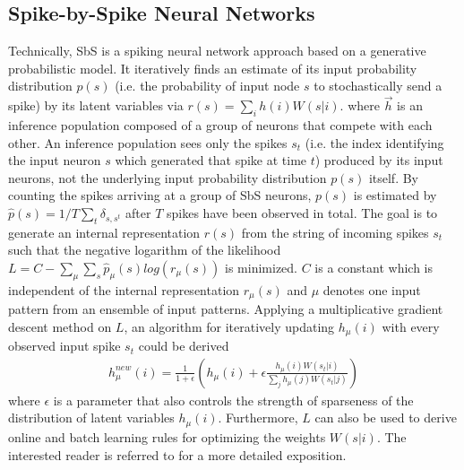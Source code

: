 \subsection{Spike-by-Spike Neural Networks}
\label{sec:sbs}

Technically, SbS is a spiking neural network approach based on a
generative probabilistic model. It iteratively finds an estimate of
its input probability distribution $p(s)$ (i.e. the probability of
input node $s$ to stochastically send a spike) by its latent variables
via $r(s) = \sum_i h(i) W(s|i)$. 
where $\vec{h}$ is an inference
population composed of a group of neurons that compete with each
other. An inference population sees only the spikes $s_t$ (i.e. the
index identifying the input neuron $s$ which generated that spike at
time $t$) produced by its input neurons, not the underlying input
probability distribution $p(s)$ itself. By counting the spikes
arriving at a group of SbS neurons, $p(s)$ is estimated by
$\hat{p}(s) = 1/T \sum_t \delta_{s,s^t}$ after $T$ spikes have been
observed in total. The goal is to generate an internal representation
$r(s)$ from the string of incoming spikes $s_t$ such that the negative
logarithm of the likelihood
$L = C - \sum_\mu \sum_s \hat{p}_\mu(s) log\left( r_\mu(s) \right)$ is
minimized. $C$ is a constant which is independent of the internal
representation $r_\mu(s)$ and $\mu$ denotes one input pattern from an
ensemble of input patterns. Applying a multiplicative gradient descent
method on $L$, an algorithm for iteratively updating $h_\mu(i)$ with
every observed input spike $s_t$ could be derived
\cite{ernst2007efficient}
  \begin{eqnarray} \label{eq:sbs_update}
  h_\mu^{new}(i) = \frac{1}{1+\epsilon} \left(h_\mu(i) + \epsilon \frac{h_\mu(i) W(s_t|i) }{\sum_j h_\mu(j) W(s_t|j)} \right) 
  \end{eqnarray}
  where $\epsilon$ is a parameter that also controls the strength of sparseness of the distribution of latent variables $h_\mu(i)$. Furthermore, $L$ can also be used to derive online and batch learning rules for optimizing the weights $W(s|i)$. The interested reader is referred to \cite{ernst2007efficient} for a more detailed exposition.

